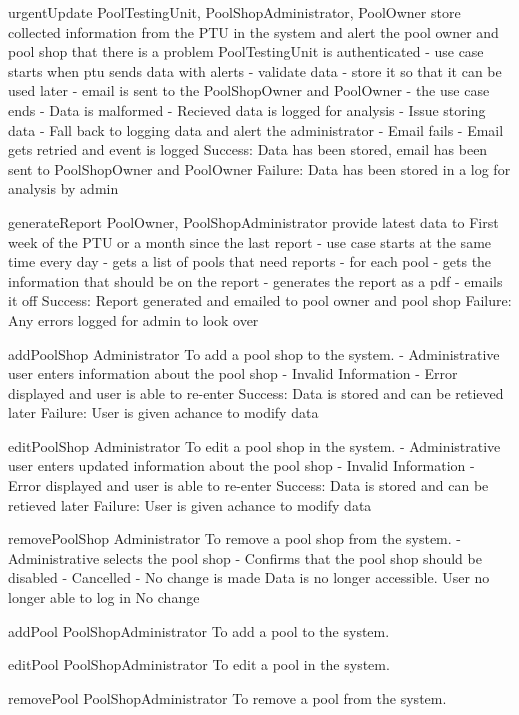 \usecase
{urgentUpdate}
{PoolTestingUnit, PoolShopAdministrator, PoolOwner}
{store collected information from the PTU in the system and alert the pool owner and pool shop that there is a problem}
{PoolTestingUnit is authenticated}
{  - use case starts when ptu sends data with alerts
  - validate data
  - store it so that it can be used later
  - email is sent to the PoolShopOwner and PoolOwner
  - the use case ends}
{  - Data is malformed
    - Recieved data is logged for analysis
  - Issue storing data
    - Fall back to logging data and alert the administrator
  - Email fails
    - Email gets retried and event is logged}
{  Success: Data has been stored, email has been sent to PoolShopOwner and PoolOwner
  Failure: Data has been stored in a log for analysis by admin}

\usecase
{generateReport}
{PoolOwner, PoolShopAdministrator}
{provide latest data to }
{First week of the PTU or a month since the last report}
{  - use case starts at the same time every day
  - gets a list of pools that need reports
  - for each pool
    - gets the information that should be on the report
    - generates the report as a pdf
    - emails it off}
{}
{  Success: Report generated and emailed to pool owner and pool shop
  Failure: Any errors logged for admin to look over}

\usecase
{addPoolShop}
{Administrator}
{To add a pool shop to the system.}
{}
{  - Administrative user enters information about the pool shop}
{  - Invalid Information
    - Error displayed and user is able to re-enter}
{Success: Data is stored and can be retieved later
Failure: User is given achance to modify data}

\usecase
{editPoolShop}
{Administrator}
{To edit a pool shop in the system.}
{}
{  - Administrative user enters updated information about the pool shop}
{  - Invalid Information
    - Error displayed and user is able to re-enter}
{Success: Data is stored and can be retieved later
Failure: User is given achance to modify data}

\usecase
{removePoolShop}
{Administrator}
{To remove a pool shop from the system.}
{}
{  - Administrative selects the pool shop
  - Confirms that the pool shop should be disabled}
{  - Cancelled
    - No change is made}
{Data is no longer accessible. User no longer able to log in}
{No change}

\usecase
{addPool}
{PoolShopAdministrator}
{To add a pool to the system.}
{}
{}
{}
{}

\usecase
{editPool}
{PoolShopAdministrator}
{To edit a pool in the system.}
{}
{}
{}
{}

\usecase
{removePool}
{PoolShopAdministrator}
{To remove a pool from the system.}
{}
{}
{}
{}




